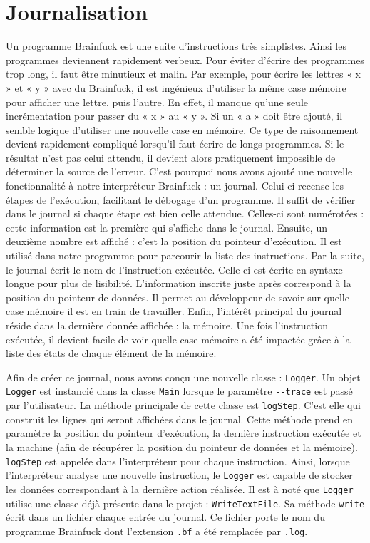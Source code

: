 \documentclass[titlepage]{article}
\begin{document}
\section{Journalisation}
    Un programme Brainfuck est une suite d’instructions très simplistes. Ainsi les programmes deviennent rapidement verbeux. Pour éviter d’écrire des programmes trop long, il faut être minutieux et malin. Par exemple, pour écrire les lettres « x » et « y » avec du Brainfuck, il est ingénieux d’utiliser la même case mémoire pour afficher une lettre, puis l’autre. En effet, il manque qu’une seule incrémentation pour passer du « x » au « y ». Si un « a » doit être ajouté, il semble logique d’utiliser une nouvelle case en mémoire. Ce type de raisonnement devient rapidement compliqué lorsqu’il faut écrire de longs programmes. Si le résultat n’est pas celui attendu, il devient alors pratiquement impossible de déterminer la source de l’erreur. C’est pourquoi nous avons ajouté une nouvelle fonctionnalité à notre interpréteur Brainfuck : un journal. Celui-ci recense les étapes de l’exécution, facilitant le débogage d'un programme. Il suffit de vérifier dans le journal si chaque étape est bien celle attendue. Celles-ci sont numérotées : cette information est la première qui s’affiche dans le journal. Ensuite, un deuxième nombre est affiché : c’est la position du pointeur d’exécution. Il est utilisé dans notre programme pour parcourir la liste des instructions. Par la suite, le journal écrit le nom de l’instruction exécutée. Celle-ci est écrite en syntaxe longue pour plus de lisibilité. L’information inscrite juste après correspond à la position du pointeur de données. Il permet au développeur de savoir sur quelle case mémoire il est en train de travailler. Enfin, l’intérêt principal du journal réside dans la dernière donnée affichée : la mémoire. Une fois l’instruction exécutée, il devient facile de voir quelle case mémoire a été impactée grâce à la liste des états de chaque élément de la mémoire.

    Afin de créer ce journal, nous avons conçu une nouvelle classe : \texttt{Logger}. Un objet \texttt{Logger} est instancié dans la classe \texttt{Main} lorsque le paramètre \texttt{-{}-trace} est passé par l’utilisateur. La méthode principale de cette classe est \texttt{logStep}. C’est elle qui construit les lignes qui seront affichées dans le journal. Cette méthode prend en paramètre la position du pointeur d’exécution, la dernière instruction exécutée et la machine (afin de récupérer la position du pointeur de données et la mémoire). \texttt{logStep} est appelée dans l’interpréteur pour chaque instruction. Ainsi, lorsque l’interpréteur analyse une nouvelle instruction, le \texttt{Logger} est capable de stocker les données correspondant à la dernière action réalisée. Il est à noté que \texttt{Logger} utilise une classe déjà présente dans le projet : \texttt{WriteTextFile}. Sa méthode \texttt{write} écrit dans un fichier chaque entrée du journal. Ce fichier porte le nom du programme Brainfuck dont l'extension \texttt{.bf} a été remplacée par \texttt{.log}.
\end{document}
